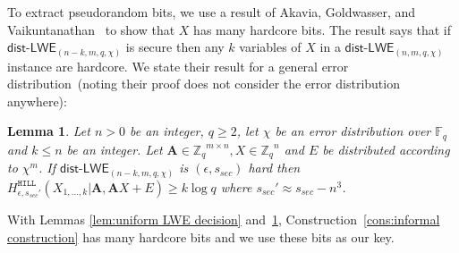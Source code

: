 \documentclass[11pt]{article}
\newcommand{\lemref}[1]{\mbox{Lemma~\ref{#1}}}
\newcommand{\consref}[1]{\mbox{Construction~\ref{#1}}}
\newcommand{\class}[1]{{\ensuremath{\mathsf{#1}}}}
\newcommand{\vect}[1]{\ensuremath{\textbf{#1}}}
\newcommand{\zq}{\ensuremath{\mathbb{Z}_q}}
\newcommand{\Fq}{\ensuremath{\mathbb{F}_q}}
\newcommand{\hill}{\ensuremath{\mathtt{HILL}}\xspace}
\newcommand{\unp}{\ensuremath{\mathtt{unp}}\xspace}
\newcommand{\poly}{\ensuremath{\mathtt{poly}}\xspace}
\newcommand{\ngl}{\ensuremath{\mathtt{ngl}}\xspace}
\newcommand{\distLWE}{\ensuremath{\class{dist\mbox{-}LWE}}}
\newtheorem{lemma}[theorem]{Lemma}
\newcommand{\vA}{\vect{A}}
\begin{document}
To extract pseudorandom bits, we use a result of Akavia, Goldwasser, and Vaikuntanathan~\cite{akavia2009} to show that $X$ has many hardcore bits.  The result says that if $\distLWE_{(n-k, m, q, \chi)}$ is secure then any $k$ variables of $X$ in a $\distLWE_{(n, m, q, \chi)}$ instance are hardcore.  We state their result for a general error distribution~(noting their proof does not consider the error distribution anywhere):
\begin{lemma}
\label{lem:many hardcore bits}
Let $n>0$ be an integer, $q\geq 2$, let $\chi$ be an error distribution over $\Fq$ and $k\leq n$ be an integer.  Let $\vA\in \zq^{m\times n} , X\in\zq^n$ and $E$ be distributed according to $\chi^m$.  If $\distLWE_{(n-k, m, q, \chi)}$ is $(\epsilon, s_{sec})$ hard then $H^{\hill}_{\epsilon, s_{sec}'}(X_{1,..., k}| \vA, \vA X+E )\geq k\log q$ where $s_{sec}' \approx s_{sec} - n^3$.
\end{lemma}

With Lemmas \ref{lem:uniform LWE decision} and~\ref{lem:many hardcore bits}, \consref{cons:informal construction} has many hardcore bits and we use these bits as our key.  
\end{document}
